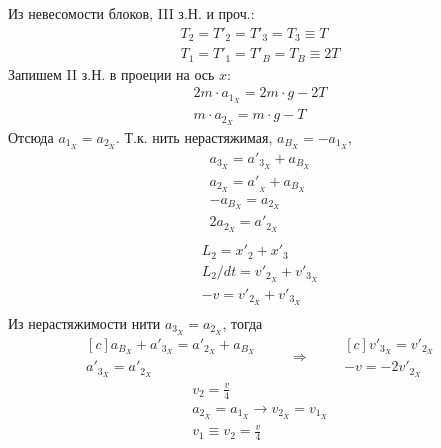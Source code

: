 \documentclass[a5paper,10pt]{article}\usepackage[usenames,dvipsnames]{color}\usepackage{extsizes,cmap,graphicx,misccorr,indentfirst,makecell,multirow,ulem,geometry,amssymb,amsfonts,amsmath,amsthm,titlesec,float,fancyhdr,wrapfig,tikz}\usepackage[T2A]{fontenc}\usepackage[utf8x]{inputenc}\usepackage[english, russian]{babel}\usetikzlibrary{decorations.pathreplacing,decorations.pathmorphing,patterns,calc,scopes,arrows,through,positioning,shapes.misc}\graphicspath{{img/}}\linespread{1.3}\frenchspacing\geometry{left=1cm, right=1cm, top=2cm, bottom=1cm, bindingoffset=0cm}\pagestyle{fancy}\fancyhead{}\fancyhead[R]{Сарафанов Ф.Г.}
\begin{document}
Из невесомости блоков, III з.Н. и проч.:
\begin{align*}
    T_2=T'_2=T'_3=T_3\equiv{T}\\
    T_1=T'_1=T'_B=T_B\equiv{2T}
\end{align*}
Запишем II з.Н. в проеции на ось $x$:
\begin{align*}
    2m\cdot{a_{1_X}}=2m\cdot{g}-2T\\
    m\cdot{a_{2_X}}=m\cdot{g}-T
\end{align*}
Отсюда $a_{1_X}=a_{2_X}$.
Т.к. нить нерастяжимая, $a_{B_X}=-a_{1_X}$, 
\begin{align*}
    {a_{3_X}}={a'_{3_X}}+a_{B_X}\\
    {a_{2_X}}={a'_{_X}}+a_{B_X}\\
    -a_{B_X}=a_{2_X}\\
    2a_{2_X}=a'_{2_X}\\
\end{align*}
\begin{align*}
    L_2=x'_2+x'_3\\
    L_2/dt=v'_{2_X}+v'_{3_X}\\
    -v=v'_{2_X}+v'_{3_X}\\
\end{align*}
Из нерастяжимости нити $a_{3_X}=a_{2_X}$, тогда
\begin{equation*}
    \begin{aligned}[c]
    a_{B_X}+a'_{3_X}=a'_{2_X}+a_{B_X}\\
    a'_{3_X}=a'_{2_X}        
    \end{aligned}
    \qquad\Rightarrow\qquad
    \begin{aligned}[c]
    v'_{3_X}=v'_{2_X}\\
    -v=-2v'_{2_X}
    \end{aligned}
\end{equation*}
\begin{align*}
    v_{2}=\frac{v}{4}\\
    a_{2_X}=a_{1_X}\rightarrow{}v_{2_X}=v_{1_X}\\
    v_{1}\equiv{}v_{2}=\frac{v}{4}\\
\end{align*}
\end{document}
